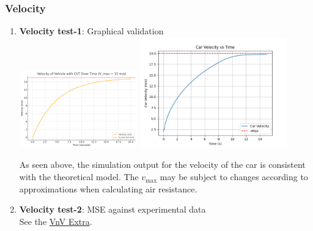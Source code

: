 \documentclass[12pt, titlepage]{article}
\begin{document}
\subsubsection{Velocity}
\begin{enumerate}
\item{\textbf{Velocity test-1}: Graphical validation}\\

\includegraphics[width=0.4\textwidth]{theoretical-figures/velocity.png}
\includegraphics[width=0.5\textwidth]{simulation-figures/car_velocity.png}

As seen above, the simulation output for the velocity of the car is consistent with the theoretical model. The $v_\text{max}$ may be subject to changes according to approximations when calculating air resistance.

\item{\textbf{Velocity test-2}: MSE against experimental data}\\
See the \href{https://github.com/gr812b/CVT-Simulator/blob/develop/docs/VnVExtra/VnVExtra.pdf}{VnV Extra}.

\end{enumerate}
\end{document}
